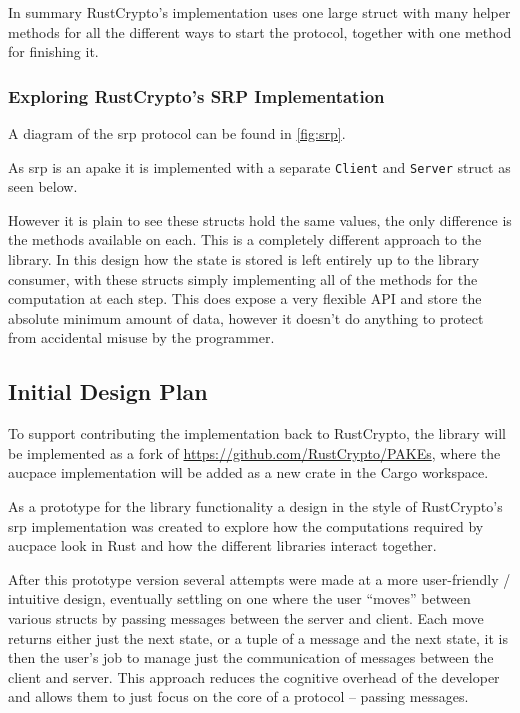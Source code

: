 In summary RustCrypto's  implementation uses one large struct with many helper methods for all the different ways to start the protocol, together with one method for finishing it.

\subsubsection{Exploring RustCrypto's SRP Implementation}
A diagram of the \gls{srp} protocol can be found in \cref{fig:srp}.

As \gls{srp} is an \gls{apake} it is implemented with a separate \texttt{Client} and \texttt{Server} struct as seen below.


However it is plain to see these structs hold the same values, the only difference is the methods available on each.
This is a completely different approach to the  library.
In this design how the state is stored is left entirely up to the library consumer, with these structs simply implementing all of the methods for the computation at each step.
This does expose a very flexible API and store the absolute minimum amount of data, however it doesn't do anything to protect from accidental misuse by the programmer.

\subsection{Initial Design Plan}
To support contributing the implementation back to RustCrypto, the library will be implemented as a fork of \url{https://github.com/RustCrypto/PAKEs},
where the \gls{aucpace} implementation will be added as a new crate in the Cargo workspace.

As a prototype for the library functionality a design in the style of RustCrypto's \gls{srp} implementation was created to explore how the computations required by \gls{aucpace} look in Rust and how the different libraries interact together.

After this prototype version several attempts were made at a more user-friendly / intuitive design, eventually settling on one where the user \enquote{moves} between various structs by passing messages between the server and client.
Each move returns either just the next state, or a tuple of a message and the next state, it is then the user's job to manage just the communication of messages between the client and server.
This approach reduces the cognitive overhead of the developer and allows them to just focus on the core of a protocol -- passing messages.

